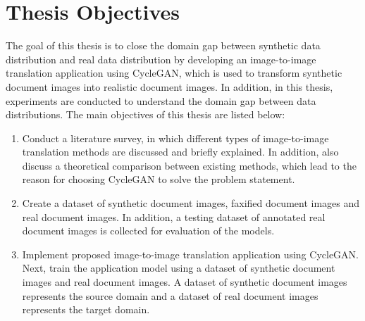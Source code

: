 \newpage
\section{Thesis Objectives}\label{thesisobjectives}
The goal of this thesis is to close the domain gap between synthetic data distribution and real data distribution by developing an image-to-image translation application using \ac{CycleGAN}, which is used to transform synthetic document images into realistic document images. In addition, in this thesis, experiments are conducted to understand the domain gap between data distributions. The main objectives of this thesis are listed below:
\begin{enumerate}
\item Conduct a literature survey, in which different types of image-to-image translation methods are discussed and briefly explained. In addition, also discuss a theoretical comparison between existing methods, which lead to the reason for choosing \ac{CycleGAN} to solve the problem statement. 

\item Create a dataset of synthetic document images, faxified document images and real document images. In addition, a testing dataset of annotated real document images is collected for evaluation of the models.

\item Implement proposed image-to-image translation application using \ac{CycleGAN}. Next, train the application model using a dataset of synthetic document images and real document images. A dataset of synthetic document images represents the source domain and a dataset of real document images represents the target domain.


\end{enumerate}
